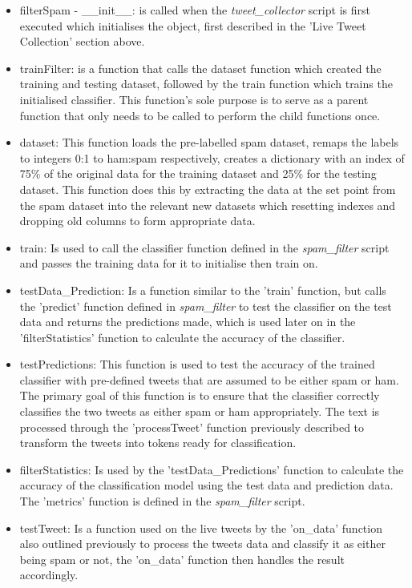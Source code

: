 \documentclass[oneside, 12pt]{article}
\begin{document}
		\begin{itemize}
			\item filterSpam - \_\_init\_\_: is called when the \textit{tweet\_collector} script is first executed which initialises the object, first described in the 'Live Tweet Collection' section above.
			\item trainFilter: is a function that calls the dataset function which created the training and testing dataset, followed by the train function which trains the initialised classifier. This function's sole purpose is to serve as a parent function that only needs to be called to perform the child functions once.
			\item dataset: This function loads the pre-labelled spam dataset, remaps the labels to integers 0:1 to ham:spam respectively, creates a dictionary with an index of 75\% of the original data for the training dataset and 25\% for the testing dataset. This function does this by extracting the data at the set point from the spam dataset into the relevant new datasets which resetting indexes and dropping old columns to form appropriate data.
			\item train: Is used to call the classifier function defined in the \textit{spam\_filter} script and passes the training data for it to initialise then train on.
			\item testData\_Prediction: Is a function similar to the 'train' function, but calls the 'predict' function defined in \textit{spam\_filter} to test the classifier on the test data and returns the predictions made, which is used later on in the 'filterStatistics' function to calculate the accuracy of the classifier.
			\item testPredictions: This function is used to test the accuracy of the trained classifier with pre-defined tweets that are assumed to be either spam or ham. The primary goal of this function is to ensure that the classifier correctly classifies the two tweets as either spam or ham appropriately. The text is processed through the 'processTweet' function previously described to transform the tweets into tokens ready for classification.
			\item filterStatistics: Is used by the 'testData\_Predictions' function to calculate the accuracy of the classification model using the test data and prediction data. The 'metrics' function is defined in the \textit{spam\_filter} script.
			\item testTweet: Is a function used on the live tweets by the 'on\_data' function also outlined previously to process the tweets data and classify it as either being spam or not, the 'on\_data' function then handles the result accordingly.
		\end{itemize}		
		
\end{document}
